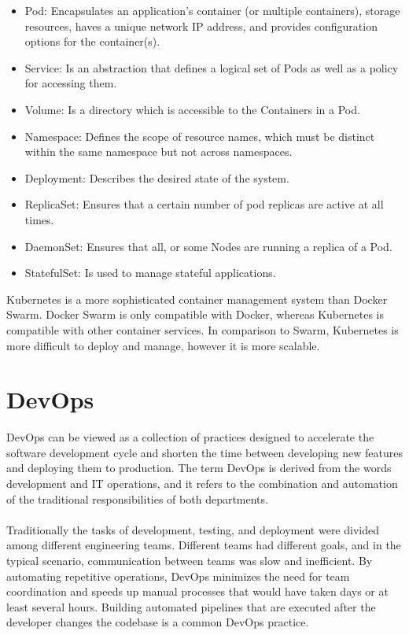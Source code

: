 \begin{itemize}
    \item Pod: Encapsulates an application's container (or multiple containers),
    storage resources, haves a unique network IP address, and provides configuration options for the container(s).
    \item Service: Is an abstraction that defines a logical set of Pods as well as a policy for accessing them.
    \item Volume: Is a directory which is accessible to the
    Containers in a Pod.
    \item Namespace: Defines the scope of resource names, which must be distinct within the same namespace but not across namespaces.
    \item Deployment: Describes the desired state of the system.
    \item ReplicaSet: Ensures that a certain number of pod replicas are active at all times.
    \item DaemonSet: Ensures that all, or some Nodes are running a replica of a Pod.
    \item StatefulSet: Is used to manage stateful applications.
\end{itemize}

Kubernetes is a more sophisticated container management system than Docker Swarm.
Docker Swarm is only compatible with Docker, whereas Kubernetes is compatible with other container services.
In comparison to Swarm, Kubernetes is more difficult to deploy and manage, however it is more scalable.

\section{DevOps} %
\label{sec:dev_ops}

DevOps can be viewed as a collection of practices designed to accelerate the software development cycle and shorten the time between developing new features and deploying them to production.
The term DevOps is derived from the words development and IT operations, and it refers to the combination and automation of the traditional responsibilities of both departments.

\paragraph{}

Traditionally the tasks of development, testing, and deployment were divided among different engineering teams.
Different teams had different goals, and in the typical scenario, communication between teams was slow and inefficient.
By automating repetitive operations, DevOps minimizes the need for team coordination and speeds up manual processes that would have taken days or at least several hours.
Building automated pipelines that are executed after the developer changes the codebase is a common DevOps practice.

